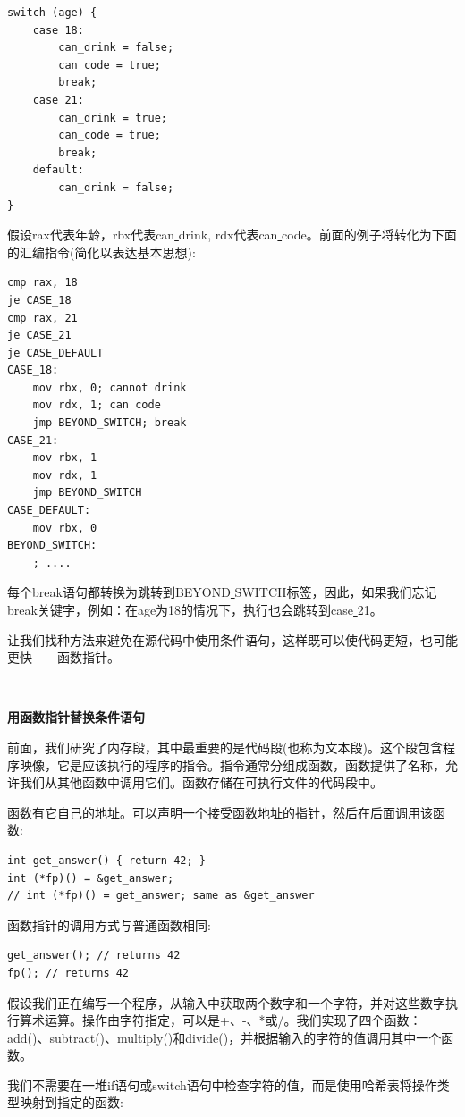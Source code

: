\begin{lstlisting}[caption={}]
switch (age) {
	case 18:
		can_drink = false;
		can_code = true;
		break;
	case 21:
		can_drink = true;
		can_code = true;
		break;
	default:
		can_drink = false;
}
\end{lstlisting}

假设rax代表年龄，rbx代表can\underline{ }drink, rdx代表can\underline{ }code。前面的例子将转化为下面的汇编指令(简化以表达基本思想): \par

\begin{lstlisting}[caption={}]
cmp rax, 18
je CASE_18
cmp rax, 21
je CASE_21
je CASE_DEFAULT
CASE_18:
	mov rbx, 0; cannot drink
	mov rdx, 1; can code
	jmp BEYOND_SWITCH; break
CASE_21:
	mov rbx, 1
	mov rdx, 1
	jmp BEYOND_SWITCH
CASE_DEFAULT:
	mov rbx, 0
BEYOND_SWITCH:
	; ....
\end{lstlisting}

每个break语句都转换为跳转到BEYOND\underline{ }SWITCH标签，因此，如果我们忘记break关键字，例如：在age为18的情况下，执行也会跳转到case\underline{ }21。 \par

让我们找种方法来避免在源代码中使用条件语句，这样既可以使代码更短，也可能更快——函数指针。 \par

\noindent\textbf{}\ \par
\textbf{用函数指针替换条件语句} \ \par
前面，我们研究了内存段，其中最重要的是代码段(也称为文本段)。这个段包含程序映像，它是应该执行的程序的指令。指令通常分组成函数，函数提供了名称，允许我们从其他函数中调用它们。函数存储在可执行文件的代码段中。\par
函数有它自己的地址。可以声明一个接受函数地址的指针，然后在后面调用该函数: \par

\begin{lstlisting}[caption={}]
int get_answer() { return 42; }
int (*fp)() = &get_answer;
// int (*fp)() = get_answer; same as &get_answer
\end{lstlisting}

函数指针的调用方式与普通函数相同: \par

\begin{lstlisting}[caption={}]
get_answer(); // returns 42
fp(); // returns 42
\end{lstlisting}

假设我们正在编写一个程序，从输入中获取两个数字和一个字符，并对这些数字执行算术运算。操作由字符指定，可以是+、-、*或/。我们实现了四个函数：add()、subtract()、multiply()和divide()，并根据输入的字符的值调用其中一个函数。 \par
我们不需要在一堆if语句或switch语句中检查字符的值，而是使用哈希表将操作类型映射到指定的函数: \par


